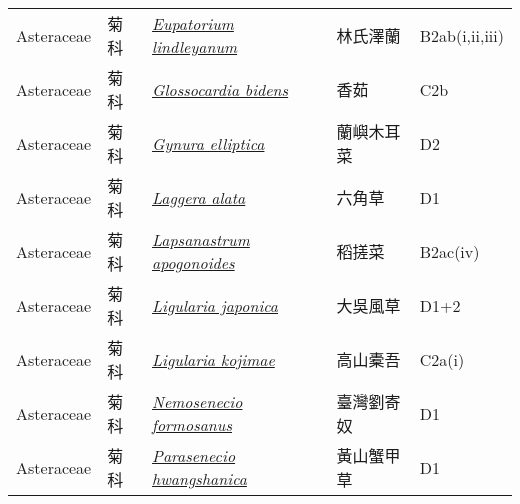 {\begin{longtable}{L{2.5cm}L{2cm}L{5cm}L{2.5cm}L{3cm}}
    Asteraceae & 菊科 & \href{http://www.theplantlist.org/tpl1.1/search?q=Eupatorium+lindleyanum}{\textit{Eupatorium lindleyanum} } & 林氏澤蘭 & B2ab(i,ii,iii)    \\
    Asteraceae & 菊科 & \href{http://www.theplantlist.org/tpl1.1/search?q=Glossocardia+bidens}{\textit{Glossocardia bidens} } & 香茹 & C2b    \\
    Asteraceae & 菊科 & \href{http://www.theplantlist.org/tpl1.1/search?q=Gynura+elliptica}{\textit{Gynura elliptica} } & 蘭嶼木耳菜 & D2    \\
    Asteraceae & 菊科 & \href{http://www.theplantlist.org/tpl1.1/search?q=Laggera+alata}{\textit{Laggera alata} } & 六角草 & D1    \\
    Asteraceae & 菊科 & \href{http://www.theplantlist.org/tpl1.1/search?q=Lapsanastrum+apogonoides}{\textit{Lapsanastrum apogonoides} } & 稻搓菜 & B2ac(iv)    \\
    Asteraceae & 菊科 & \href{http://www.theplantlist.org/tpl1.1/search?q=Ligularia+japonica}{\textit{Ligularia japonica} } & 大吳風草 & D1+2    \\
    Asteraceae & 菊科 & \href{http://www.theplantlist.org/tpl1.1/search?q=Ligularia+kojimae}{\textit{Ligularia kojimae} } & 高山橐吾 & C2a(i)    \\
    Asteraceae & 菊科 & \href{http://www.theplantlist.org/tpl1.1/search?q=Nemosenecio+formosanus}{\textit{Nemosenecio formosanus} } & 臺灣劉寄奴 & D1    \\
    Asteraceae & 菊科 & \href{http://www.theplantlist.org/tpl1.1/search?q=Parasenecio+hwangshanica}{\textit{Parasenecio hwangshanica} } & 黃山蟹甲草 & D1    \\

\end{longtable}}

